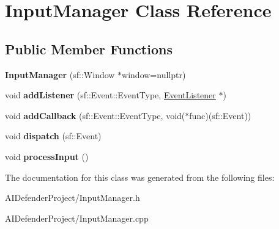 \hypertarget{class_input_manager}{}\section{Input\+Manager Class Reference}
\label{class_input_manager}
\subsection*{Public Member Functions}
\begin{DoxyCompactItemize}
\item 
\mbox{\label{class_input_manager_a425a05f7defe636300aa67f31ba8e69a}} 
{\bfseries Input\+Manager} (sf\+::\+Window $\ast$window=nullptr)
\item 
\mbox{\label{class_input_manager_a45002a46e5bdcb505d5c6a63987333bd}} 
void {\bfseries add\+Listener} (sf\+::\+Event\+::\+Event\+Type, \hyperlink{class_event_listener}{Event\+Listener} $\ast$)
\item 
\mbox{\label{class_input_manager_aed7568fce1d9e66f3e98032de3b51c16}} 
void {\bfseries add\+Callback} (sf\+::\+Event\+::\+Event\+Type, void($\ast$func)(sf\+::\+Event))
\item 
\mbox{\label{class_input_manager_a5cf3293b1e67db618284ff0040c0ddff}} 
void {\bfseries dispatch} (sf\+::\+Event)
\item 
\mbox{\label{class_input_manager_a5a14083a10c5d2da3febe3f6e68f6803}} 
void {\bfseries process\+Input} ()
\end{DoxyCompactItemize}


The documentation for this class was generated from the following files\+:\begin{DoxyCompactItemize}
\item 
A\+I\+Defender\+Project/Input\+Manager.\+h\item 
A\+I\+Defender\+Project/Input\+Manager.\+cpp\end{DoxyCompactItemize}
